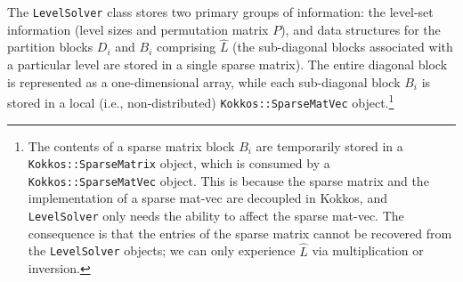 \documentclass[12pt]{article}
\begin{document}
The \texttt{LevelSolver} class stores two primary groups of information: the level-set information (level sizes and permutation matrix $P$), and data structures for the partition blocks $D_i$ and $B_i$ comprising $\hat{L}$ (the sub-diagonal blocks associated with a particular level are stored in a single sparse matrix). The entire diagonal block is represented as a one-dimensional array, while each sub-diagonal block $B_i$ is stored in a local (i.e., non-distributed) \texttt{Kokkos::SparseMatVec} object.\footnote{The contents of a sparse matrix block $B_i$ are temporarily stored in a \texttt{Kokkos::SparseMatrix} object, which is consumed by a \texttt{Kokkos::SparseMatVec} object. This is because the sparse matrix and the implementation of a sparse mat-vec are decoupled in Kokkos, and \texttt{LevelSolver} only needs the ability to affect the sparse mat-vec. The consequence is that the entries of the sparse matrix cannot be recovered from the \texttt{LevelSolver} objects; we can only experience $\hat{L}$ via multiplication or inversion.} 
\end{document}
